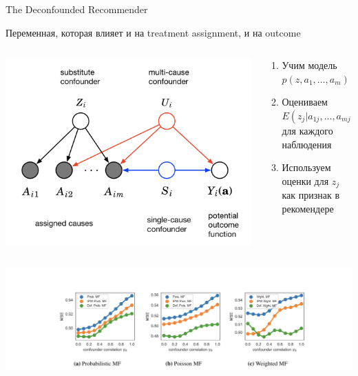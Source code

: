 \documentclass[11pt,aspectratio=169,handout]{beamer}
\begin{document}
\begin{frame}{The Deconfounded Recommender \cite{DECONF}}

\vfill

\begin{tcolorbox}[colback=gray!5,colframe=gray!80,title=Confounder]
Переменная, которая влияет и на treatment assignment, и на outcome
\end{tcolorbox}

\begin{columns}
\begin{column}{0.4\textwidth}
\begin{center}
\includegraphics[scale=0.2]{images/blessings.png}
\end{center}
\end{column}

\begin{column}{0.5\textwidth}
\begin{enumerate}
\item Учим модель $p(z, a_1, \ldots, a_m)$
\item Оцениваем $E(z_j | a_{1j}, \ldots, a_{mj})$ для каждого наблюдения
\item Используем оценки для $z_j$ как признак в рекомендере
\end{enumerate}
\end{column}
\end{columns}

\end{frame}

\begin{frame}

\begin{center}
\includegraphics[scale=0.6]{images/deconf-result.png}
\end{center}

\end{frame}
\end{document}
